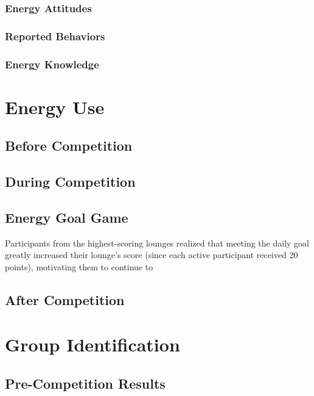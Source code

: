 \subsubsection{Energy Attitudes}

\subsubsection{Reported Behaviors}

\subsubsection{Energy Knowledge}



\section{Energy Use}


\subsection{Before Competition}


\subsection{During Competition}

\subsection{Energy Goal Game}

Participants from the highest-scoring lounges realized that meeting the daily goal greatly increased their lounge's score (since each active participant received 20 points), motivating them to continue to 

\subsection{After Competition}




\section{Group Identification}

\subsection{Pre-Competition Results}

